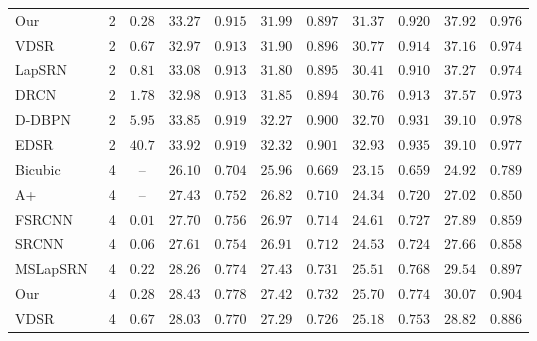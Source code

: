 \documentclass[letterpaper]{article}
\begin{document}
\begin{table*}[ht]
{\begin{tabular}{lcccccccccc}
    \rowcolor{lightgray} Our            & 2 & $0.28$ & $33.27$ & {\color{blue}$0.915$} & $31.99$ & $0.897$ & {\color{brown}$31.37$} & {\color{brown}$0.920$} & {\color{brown}$37.92$} & {\color{brown}$0.976$} \\
    VDSR~\cite{Kim_2016_VDSR}           & 2 & $0.67$ & $32.97$ & $0.913$ & $31.90$ & $0.896$ & $30.77$ & $0.914$ & $37.16$ & $0.974$ \\
    LapSRN~\cite{LapSRN}                & 2 & $0.81$ & $33.08$ & $0.913$ & $31.80$ & $0.895$ & $30.41$ & $0.910$ & $37.27$ & $0.974$ \\
    DRCN~\cite{Kim_2016_DRCN}           & 2 & $1.78$ & $32.98$ & $0.913$ & $31.85$ & $0.894$ & $30.76$ & $0.913$ & $37.57$ & $0.973$ \\
    D-DBPN~\cite{DBPN2018}              & 2 & $5.95$ & {\color{blue}$33.85$} & {\color{red}$0.919$} & {\color{blue}$32.27$} & {\color{blue}$0.900$} & {\color{blue}$32.70$} & {\color{blue}$0.931$} & {\color{blue}$39.10$} & {\color{red}$0.978$} \\
    EDSR~\cite{Lim_2017_CVPR_Workshops} & 2 & $40.7$ & {\color{red}$33.92$} & {\color{red}$0.919$} & {\color{red}$32.32$} & {\color{red}$0.901$} & {\color{red}$32.93$} & {\color{red}$0.935$} & {\color{red}$39.10$} & {\color{blue}$0.977$} \\
    \noalign{\smallskip}\hline\noalign{\smallskip}
    Bicubic                             & 4 & -- & $26.10$ & $0.704$ & $25.96$ & $0.669$ & $23.15$ & $0.659$ & $24.92$ & $0.789$ \\
    A+~\cite{Timofte_2014a}             & 4 & -- & $27.43$ & $0.752$ & $26.82$ & $0.710$ & $24.34$ & $0.720$ & $27.02$ & $0.850$ \\
    FSRCNN~\cite{Dong_2016a}            & 4 & $0.01$ & $27.70$ & $0.756$ & $26.97$ & $0.714$ & $24.61$ & $0.727$ & $27.89$ & $0.859$ \\
    SRCNN~\cite{Dong_2014a}             & 4 & $0.06$ & $27.61$ & $0.754$ & $26.91$ & $0.712$ & $24.53$ & $0.724$ & $27.66$ & $0.858$ \\
    MSLapSRN~\cite{MSLapSRN}            & 4 & $0.22$ & $28.26$ & $0.774$ & {\color{brown}$27.43$} & $0.731$ & $25.51$ & $0.768$ & $29.54$ & $0.897$ \\
    \rowcolor{lightgray} Our            & 4 & $0.28$ & {\color{brown}$28.43$} & {\color{brown}$0.778$} & $27.42$ & {\color{brown}$0.732$} & {\color{brown}$25.70$} & {\color{brown}$0.774$} & {\color{brown}$30.07$} & {\color{brown}$0.904$} \\
    VDSR~\cite{Kim_2016_VDSR}           & 4 & $0.67$ & $28.03$ & $0.770$ & $27.29$ & $0.726$ & $25.18$ & $0.753$ & $28.82$ & $0.886$ \\

\end{tabular}}
\end{table*}
\end{document}
